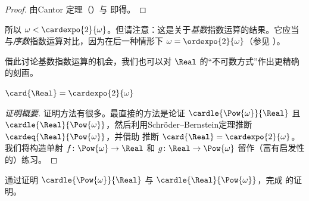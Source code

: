 \documentclass[../../../include/open-logic-section]{subfiles}
\begin{document}
\begin{proof}
由Cantor 定理（）与  即得。
\end{proof}



所以 $\omega < \cardexpo{2}{\omega}$。但请注意：这是关于\emph{基数}指数运算的结果。它应当与\emph{序数}指数运算对比，因为在后一种情形下 $\omega = \ordexpo{2}{\omega}$（参见 ）。

借此讨论基数指数运算的机会，我们也可以对 $\Real$ 的“不可数方式”作出更精确的刻画。


\begin{thm}
$\card{\Real} = \cardexpo{2}{\omega}$
\end{thm}

\begin{proof}[证明概要]
证明方法有很多。最直接的方法是论证 $\cardle{\Pow{\omega}}{\Real}$ 且 $\cardle{\Real}{\Pow{\omega}}$，然后利用Schröder--Bernstein定理推断 $\cardeq{\Real}{\Pow{\omega}}$，并借助  推断 $\card{\Real} = \cardexpo{2}{\omega}$。
我们将构造单射 $f \colon \Pow{\omega} \to \Real$ 和 $g \colon \Real \to \Pow{\omega}$ 留作（富有启发性的）练习。
\end{proof}

\begin{prob}
通过证明 $\cardle{\Pow{\omega}}{\Real}$ 与 $\cardle{\Real}{\Pow{\omega}}$，完成  的证明。
\end{prob}
\end{document}
